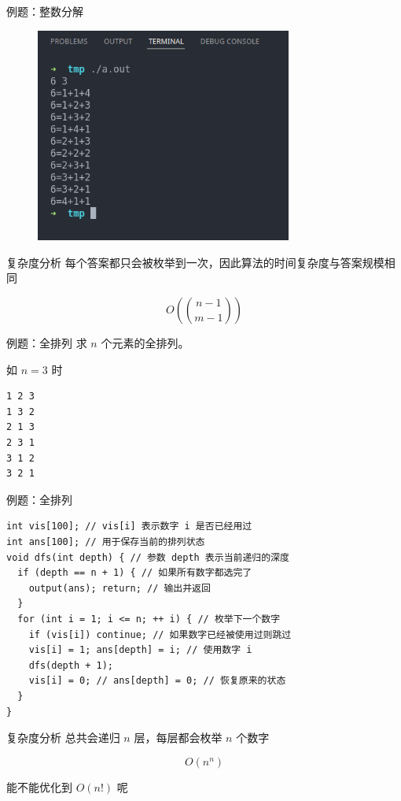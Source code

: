 \documentclass[12pt,aspectratio=169]{beamer}
\begin{document}
\begin{frame}[fragile]{例题：整数分解}
  \begin{figure}
    \includegraphics[height=200pt]{example1.png}
  \end{figure}
\end{frame}

\begin{frame}[fragile]{复杂度分析}
  每个答案都只会被枚举到一次，因此算法的时间复杂度与答案规模相同\pause

  $$O({n-1 \choose m-1})$$
\end{frame}

\begin{frame}[fragile]{例题：全排列}
  求 $n$ 个元素的全排列。

  如 $n=3$ 时

  \begin{verbatim}
1 2 3
1 3 2
2 1 3
2 3 1
3 1 2
3 2 1
  \end{verbatim}
\end{frame}


\begin{frame}[fragile]{例题：全排列}
  \begin{verbatim}
int vis[100]; // vis[i] 表示数字 i 是否已经用过
int ans[100]; // 用于保存当前的排列状态
void dfs(int depth) { // 参数 depth 表示当前递归的深度
  if (depth == n + 1) { // 如果所有数字都选完了
    output(ans); return; // 输出并返回
  }
  for (int i = 1; i <= n; ++ i) { // 枚举下一个数字
    if (vis[i]) continue; // 如果数字已经被使用过则跳过
    vis[i] = 1; ans[depth] = i; // 使用数字 i
    dfs(depth + 1);
    vis[i] = 0; // ans[depth] = 0; // 恢复原来的状态
  }
}
  \end{verbatim}
\end{frame}

\begin{frame}[fragile]{复杂度分析}
  总共会递归 $n$ 层，每层都会枚举 $n$ 个数字\pause

  $$O(n^n)$$\pause

  能不能优化到 $O(n!)$ 呢
\end{frame}
\end{document}
